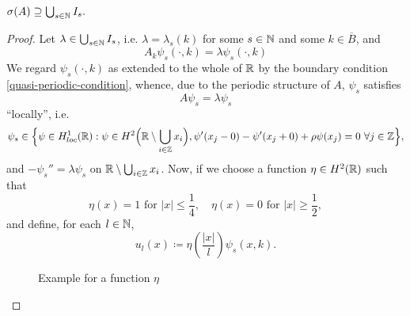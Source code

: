 \begin{theorem} \label{4.1:thm-MainResult.FirstInclusion}
	$\sigma(A) \supseteq \bigcup_{s \in \mathbb{N}} I_{s}.$
	
	\begin{proof}
		Let $\lambda \in \bigcup_{s \in \mathbb{N}} I_{s}$, i.e. $\lambda = \lambda_{s}(k)$ for some $s \in \mathbb{N}$ and some $k \in \overline{B}$, and 
		\begin{equation}
			A_{k} \psi_{s}(\cdot, k) = \lambda \psi_{s}(\cdot, k) \label{firstinclusion-firstequation} 
		\end{equation} 
		We regard $\psi_{s}(\cdot, k)$ as extended to the whole of $\mathbb{R}$ by the boundary condition \eqref{quasi-periodic-condition}, whence, due to the periodic structure of $A$, $\psi_{s}$ satisfies
		\[ A \psi_{s} = \lambda \psi_{s} \]
		\enquote{locally}, i.e. 
		\[ \psi_{s} \in \Big\{ \psi \in  H^{1}_{loc}(\mathbb{R}) : \psi \in H^{2}\Big(\mathbb{R} \setminus \bigcup_{i \in \mathbb{Z}} x_{i} \Big), \psi'(x_{j} - 0) - \psi'(x_{j} + 0) + \rho  \psi(x_{j}) = 0 ~\forall j \in \mathbb{Z} \Big\}, \]
		and $ -\psi_{s}'' = \lambda \psi_{s}$ on $\mathbb{R} \setminus \bigcup_{i \in \mathbb{Z}} x_{i}$. Now, if we choose a function $\eta \in H^{2}(\mathbb{R})$ such that 
			\begin{equation}
				\eta(x) = 1 \text{ for } |x| \leq \frac{1}{4}, \quad \eta(x) = 0 \text{ for } |x| \geq \frac{1}{2}, \label{eta}
			\end{equation} 
		and define, for each $l \in \mathbb{N}$,
			\[ u_{l}(x) \coloneqq \eta\left(\frac{|x|}{l}\right) \psi_{s}(x, k). \]
\begin{figure}[!ht] \centering
	\caption{Example for a function $\eta$} 
\end{figure}		
		

\end{proof}
\end{theorem}

